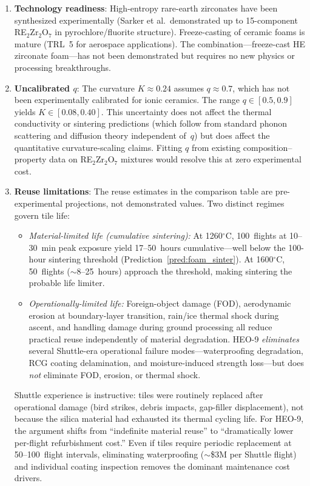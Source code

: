 \documentclass[12pt,letterpaper]{article}
\theoremstyle{definition}
\begin{document}
\begin{enumerate}
  \item \textbf{Technology readiness}: High-entropy rare-earth zirconates have been synthesized experimentally (Sarker et al.\ demonstrated up to 15-component RE$_2$Zr$_2$O$_7$ in pyrochlore/fluorite structure).  Freeze-casting of ceramic foams is mature (TRL~5 for aerospace applications).  The combination---freeze-cast HE zirconate foam---has not been demonstrated but requires no new physics or processing breakthroughs.

  \item \textbf{Uncalibrated $q$}: The curvature $K \approx 0.24$ assumes $q \approx 0.7$, which has not been experimentally calibrated for ionic ceramics.  The range $q \in [0.5, 0.9]$ yields $K \in [0.08, 0.40]$.  This uncertainty does not affect the thermal conductivity or sintering predictions (which follow from standard phonon scattering and diffusion theory independent of~$q$) but does affect the quantitative curvature-scaling claims.  Fitting $q$ from existing composition--property data on RE$_2$Zr$_2$O$_7$ mixtures would resolve this at zero experimental cost.

  \item \textbf{Reuse limitations}: The reuse estimates in the comparison table are pre-experimental projections, not demonstrated values.  Two distinct regimes govern tile life:
  \begin{itemize}
    \item \emph{Material-limited life (cumulative sintering):} At 1260$^\circ$C, 100~flights at 10--30~min peak exposure yield 17--50~hours cumulative---well below the 100-hour sintering threshold (Prediction~\ref{pred:foam_sinter}).  At 1600$^\circ$C, 50~flights ($\sim$8--25~hours) approach the threshold, making sintering the probable life limiter.
    \item \emph{Operationally-limited life:} Foreign-object damage (FOD), aerodynamic erosion at boundary-layer transition, rain/ice thermal shock during ascent, and handling damage during ground processing all reduce practical reuse independently of material degradation.  HEO-9 \emph{eliminates} several Shuttle-era operational failure modes---waterproofing degradation, RCG coating delamination, and moisture-induced strength loss---but does \emph{not} eliminate FOD, erosion, or thermal shock.
  \end{itemize}
  Shuttle experience is instructive: tiles were routinely replaced after operational damage (bird strikes, debris impacts, gap-filler displacement), not because the silica material had exhausted its thermal cycling life.  For HEO-9, the argument shifts from ``indefinite material reuse'' to ``dramatically lower per-flight refurbishment cost.''  Even if tiles require periodic replacement at 50--100~flight intervals, eliminating waterproofing ($\sim$\$3M per Shuttle flight) and individual coating inspection removes the dominant maintenance cost drivers.
\end{enumerate}
\end{document}
